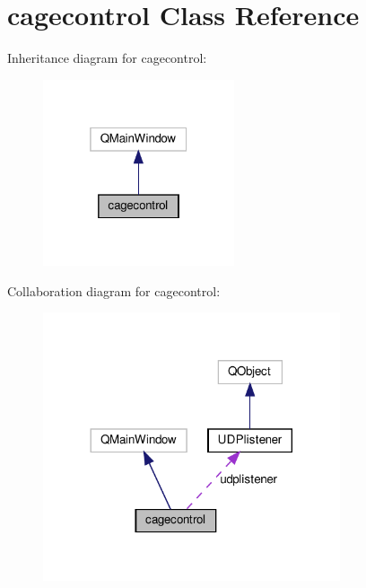 \hypertarget{classcagecontrol}{}\section{cagecontrol Class Reference}
\label{classcagecontrol}


Inheritance diagram for cagecontrol\+:\nopagebreak
\begin{figure}[H]
\begin{center}
\leavevmode
\includegraphics[width=160pt]{classcagecontrol__inherit__graph}
\end{center}
\end{figure}


Collaboration diagram for cagecontrol\+:
\nopagebreak
\begin{figure}[H]
\begin{center}
\leavevmode
\includegraphics[width=248pt]{classcagecontrol__coll__graph}
\end{center}
\end{figure}

